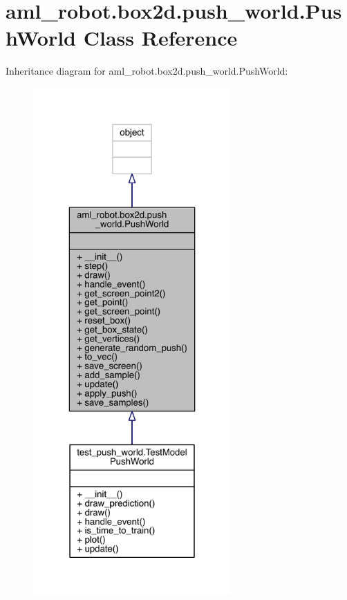 \hypertarget{classaml__robot_1_1box2d_1_1push__world_1_1_push_world}{}\section{aml\+\_\+robot.\+box2d.\+push\+\_\+world.\+Push\+World Class Reference}
\label{classaml__robot_1_1box2d_1_1push__world_1_1_push_world}


Inheritance diagram for aml\+\_\+robot.\+box2d.\+push\+\_\+world.\+Push\+World\+:
\nopagebreak
\begin{figure}[H]
\begin{center}
\leavevmode
\includegraphics[height=550pt]{classaml__robot_1_1box2d_1_1push__world_1_1_push_world__inherit__graph}
\end{center}
\end{figure}


